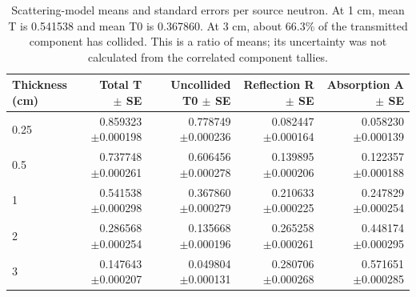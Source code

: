 \documentclass[10pt,letterpaper]{article}
\begin{document}
\begin{table}[H]\centering\small
\setlength{\tabcolsep}{5pt}
\renewcommand{\arraystretch}{1.22}
\begin{tabular}{@{}lrrrr@{}}
\toprule
Thickness (cm) & Total T \(\pm\) SE & Uncollided T0 \(\pm\) SE & Reflection R \(\pm\) SE & Absorption A \(\pm\) SE\\
\midrule
0.25 & \shortstack[r]{0.859323\\\(\pm\)0.000198} & \shortstack[r]{0.778749\\\(\pm\)0.000236} & \shortstack[r]{0.082447\\\(\pm\)0.000164} & \shortstack[r]{0.058230\\\(\pm\)0.000139}\\
0.5 & \shortstack[r]{0.737748\\\(\pm\)0.000261} & \shortstack[r]{0.606456\\\(\pm\)0.000278} & \shortstack[r]{0.139895\\\(\pm\)0.000206} & \shortstack[r]{0.122357\\\(\pm\)0.000188}\\
1 & \shortstack[r]{0.541538\\\(\pm\)0.000298} & \shortstack[r]{0.367860\\\(\pm\)0.000279} & \shortstack[r]{0.210633\\\(\pm\)0.000225} & \shortstack[r]{0.247829\\\(\pm\)0.000254}\\
2 & \shortstack[r]{0.286568\\\(\pm\)0.000254} & \shortstack[r]{0.135668\\\(\pm\)0.000196} & \shortstack[r]{0.265258\\\(\pm\)0.000261} & \shortstack[r]{0.448174\\\(\pm\)0.000295}\\
3 & \shortstack[r]{0.147643\\\(\pm\)0.000207} & \shortstack[r]{0.049804\\\(\pm\)0.000131} & \shortstack[r]{0.280706\\\(\pm\)0.000268} & \shortstack[r]{0.571651\\\(\pm\)0.000285}\\
\bottomrule
\end{tabular}
\caption{Scattering-model means and standard errors per source neutron. At 1 cm, mean T is 0.541538 and mean T0 is 0.367860. At 3 cm, about 66.3\% of the transmitted component has collided. This is a ratio of means; its uncertainty was not calculated from the correlated component tallies.}
\end{table}
\end{document}
